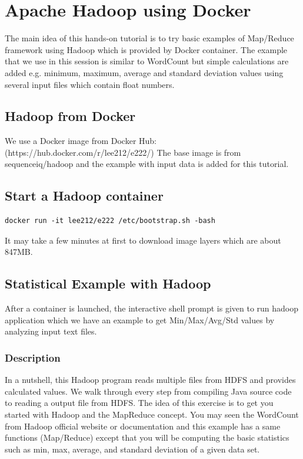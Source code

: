 \section{Apache Hadoop using Docker}\label{apache-hadoop-with-docker}

The main idea of this hands-on tutorial is to try basic examples of Map/Reduce
framework using Hadoop which is provided by Docker container. The example
that we use in this session is similar to WordCount but simple calculations are
added e.g. minimum, maximum, average and standard deviation values using
several input files which contain float numbers.

\subsection{Hadoop from Docker}\label{ahwd-hadoop-docker}

We use a Docker image from Docker Hub: (https://hub.docker.com/r/lee212/e222/) 
The base image is from sequenceiq/hadoop and the example with input data is
added for this tutorial.

\subsection{Start a Hadoop container}\label{ahwd-start}

\begin{lstlisting}
docker run -it lee212/e222 /etc/bootstrap.sh -bash
\end{lstlisting}

It may take a few minutes at first to download image layers which are about
847MB.

\subsection{Statistical Example with Hadoop}       

After a container is launched, the interactive shell prompt is given to run
hadoop application which we have an example to get Min/Max/Avg/Std values by
analyzing input text files.

\subsubsection{Description}

In a nutshell, this Hadoop program reads multiple files from HDFS and provides
calculated values. We walk through every step from compiling Java source code
to reading a output file from HDFS. The idea of this exercise is to get you
started with Hadoop and the MapReduce concept. You may seen the WordCount from
Hadoop official website or documentation and this example has a same functions
(Map/Reduce) except that you will be computing the basic statistics such as
min, max, average, and standard deviation of a given data set.


